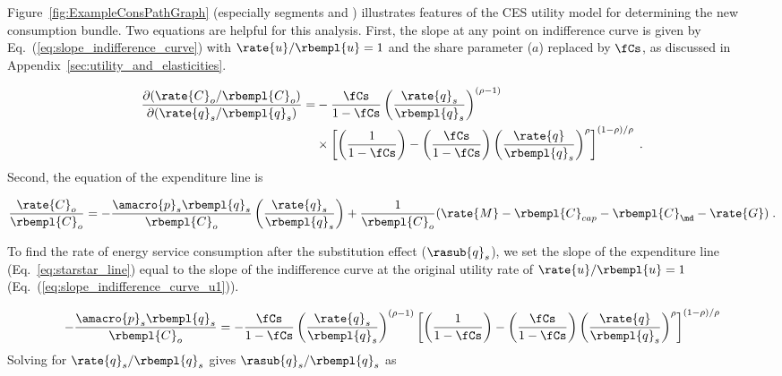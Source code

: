 Figure~\ref{fig:ExampleConsPathGraph} 
(especially segments \starc{} and \chat{})
illustrates features
of the CES utility model for determining the new consumption bundle.
Two equations are helpful for this analysis.
First, the slope at any point on indifference curve \iicirc{} 
is given by Eq.~(\ref{eq:slope_indifference_curve}) with 
$\rate{u}/\rbempl{u} = 1$ and 
the share parameter ($a$) replaced by $\fCs$,
as discussed in Appendix~\ref{sec:utility_and_elasticities}.

\begin{align} \label{eq:slope_indifference_curve_u1}
  \frac{\partial (\rate{C}_o/\rbempl{C}_o)}{\partial (\rate{q}_s/\rbempl{q}_s)} =&
        -\frac{\fCs}{1 - \fCs} \left( \frac{\rate{q}_s}{\rbempl{q}_s} \right)^{(\rho -1)} \nonumber  \\
        &\times \left[ \left( \frac{1}{1 - \fCs} \right) 
                - \left( \frac{\fCs}{1 - \fCs} \right) 
                          \left( \frac{\rate{q}}{\rbempl{q}_s} \right)^\rho \right]^{(1 - \rho)/\rho} \; .
\end{align}
%
Second, the equation of the \starstar{} expenditure line is

\begin{equation} \label{eq:starstar_line}
  \frac{\rate{C}_o}{\rbempl{C}_o} = 
      -\frac{\amacro{p}_s \rbempl{q}_s}
            {\rbempl{C}_o}
        \left(  \frac{\rate{q}_s}{\rbempl{q}_s} \right)
      + \frac{1}{\rbempl{C}_o} 
        (\rate{M} - \rbempl{C}_{cap} - \rbempl{C}_{\md} - \rate{G}) \; .
\end{equation}

To find the rate of energy service consumption after the substitution effect
($\rasub{q}_s$), we set the slope of the \starstar{} expenditure line (Eq.~\ref{eq:starstar_line})
equal to the slope of the \iicirc{} indifference curve 
at the original utility rate of $\rate{u}/\rbempl{u} = 1$ (Eq.~(\ref{eq:slope_indifference_curve_u1})).

\begin{equation}
  -\frac{\amacro{p}_s \rbempl{q}_s}
        {\rbempl{C}_o} = 
    -\frac{\fCs}{1 - \fCs} \left( \frac{\rate{q}_s}{\rbempl{q}_s} \right)^{(\rho -1)} %
        \left[ \left( \frac{1}{1 - \fCs} \right) 
                - \left( \frac{\fCs}{1 - \fCs} \right) 
                          \left( \frac{\rate{q}}{\rbempl{q}_s} \right)^\rho \right]^{(1 - \rho)/\rho}
\end{equation}
%
Solving for $\rate{q}_s/\rbempl{q}_s$ gives $\rasub{q}_s/\rbempl{q}_s$ as


